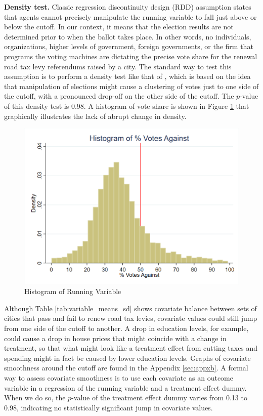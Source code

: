 {\bf Density test.} Classic regression discontinuity design (RDD) assumption states that agents cannot precisely manipulate the running variable to fall just above or below the cutoff. In our context, it means that the election results are not determined prior to when the ballot takes place. In other words, no individuals, organizations, higher levels of government, foreign governments, or the firm that programs the voting machines are dictating the precise vote share for the renewal road tax levy referendums raised by a city. The standard way to test this assumption is to perform a density test like that of \cite{cattaneo2020simple}, which is based on the idea that manipulation of elections might cause a clustering of votes just to one side of the cutoff, with a pronounced drop-off on the other side of the cutoff. The $p$-value of this density test is 0.98. A histogram of vote share is shown in Figure \ref{fig:running_var_hist} that graphically illustrates the lack of abrupt change in density.

\begin{figure}[ht]
    \centering
    \includegraphics[width=\textwidth,keepaspectratio]{images/votes_pct_against_histogram.png}
    \caption{Histogram of Running Variable}
    \label{fig:running_var_hist}
\end{figure}

Although Table \ref{tab:variable_means_sd} shows covariate balance between sets of cities that pass and fail to renew road tax levies, covariate values could still jump from one side of the cutoff to another. A drop in education levels, for example, could cause a drop in house prices that might coincide with a change in treatment, so that what might look like a treatment effect from cutting taxes and spending might in fact be caused by lower education levels.  Graphs of covariate smoothness around the cutoff are found in the Appendix \ref{sec:appxb}. A formal way to assess covariate smoothness is to use each covariate as an outcome variable in a regression of the running variable and a treatment effect dummy. When we do so, the $p$-value of the treatment effect dummy varies from 0.13 to 0.98, indicating no statistically significant jump in covariate values. 



